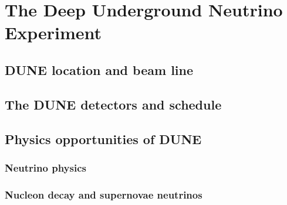 \chapter{The Deep Underground Neutrino Experiment}  %

\graphicspath{{DUNE/Figs/PDF/}{DUNE/Figs/Raster/}{DUNE/Figs/Vector}}


\section{DUNE location and beam line} %

\section{The DUNE detectors and schedule} \label{sec:DUNEDetector} %

\section{Physics opportunities of DUNE} %

\subsection{Neutrino physics}  %

\subsection{Nucleon decay and supernovae neutrinos}  \label{sec:NDK_Atmos}%

